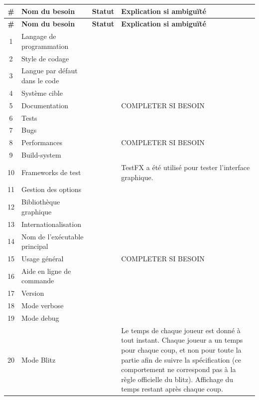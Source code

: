 \documentclass{article}
\newcommand{\valid}{\textcolor{green}{\ding{108}}}  %
\newcommand{\semivalid}{\textcolor{orange}{\ding{108}}}  %
\newcommand{\nonvalid}{\textcolor{red}{\ding{108}}}  %
\begin{document}
\begin{longtable}{|c|p{5cm}|c|p{5cm}|}
    \hline
    \textbf{\#} & \textbf{Nom du besoin} & \textbf{Statut} & \textbf{Explication si ambiguïté} \\
    \hline
    \endfirsthead

    \hline
    \textbf{\#} & \textbf{Nom du besoin} & \textbf{Statut} & \textbf{Explication si ambiguïté} \\
    \hline
    \endhead

    \hline
    1 & Langage de programmation & \valid & \\
    \hline
    2 & Style de codage & \valid & \\
    \hline
    3 & Langue par défaut dans le code & \valid & \\
    \hline
    4 & Système cible & \valid & \\
    \hline
    5 & Documentation & \semivalid & COMPLETER SI BESOIN \\
    \hline
    6 & Tests & \valid & \\
    \hline
    7 & Bugs & \valid & \\
    \hline
    8 & Performances & \nonvalid & COMPLETER SI BESOIN \\
    \hline
    9 & Build-system & \valid & \\
    \hline
    10 & Frameworks de test & \valid & TestFX a été utilisé pour tester l'interface graphique. \\
    \hline
    11 & Gestion des options & \valid & \\
    \hline
    12 & Bibliothèque graphique & \valid & \\
    \hline
    13 & Internationalisation & \valid & \\
    \hline
    14 & Nom de l’exécutable principal & \semivalid & \\
    \hline
    15 & Usage général & \semivalid & COMPLETER SI BESOIN \\
    \hline
    16 & Aide en ligne de commande & \valid & \\
    \hline
    17 & Version & \valid & \\
    \hline
    18 & Mode verbose & \valid & \\
    \hline
    19 & Mode debug & \valid & \\
    \hline
    20 & Mode Blitz & \valid & Le temps de chaque joueur est donné à tout instant. Chaque joueur a un temps pour chaque coup, et non pour toute la partie afin de suivre la spécification (ce comportement ne correspond pas à la règle officielle du blitz). Affichage du temps restant après chaque coup.\\

\end{longtable}
\end{document}
